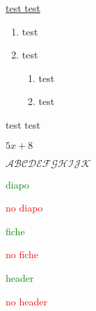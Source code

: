 \documentclass{classe-tex3R-2-1}
\begin{document}







\ul{test \hfill test}


\begin{enumerate}
  \item test
  \item test
  \begin{enumerate}
    \item test
    \item test
  \end{enumerate}
\end{enumerate}



\begin{tasks}[style=enumerate]
  \task test
  \task test
\end{tasks}


$5x+8 $

$\mathcal{ABCDEFGHIJK}$


\rivdifficulte


\begin{scratch}
\end{scratch}




\ifdiapo \textcolor{green}{diapo}\par \else \hfill \textcolor{red}{no} \textcolor{red}{diapo}\par \fi
\iffiche \textcolor{green}{fiche}\par \else \hfill \textcolor{red}{no} \textcolor{red}{fiche}\par \fi
\ifheader \textcolor{green}{header}\par \else \hfill \textcolor{red}{no} \textcolor{red}{header}\par \fi
\end{document}
